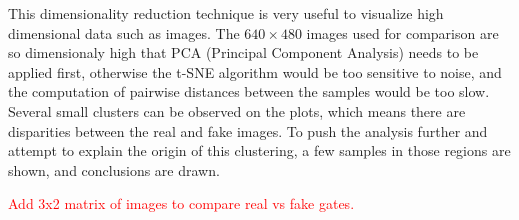 This dimensionality reduction technique is very useful to visualize high
dimensional data such as images. The $640 \times 480$ images used for
comparison are so dimensionaly high that PCA (Principal Component Analysis)
needs to be applied first, otherwise the t-SNE algorithm would be too sensitive
to noise, and the computation of pairwise distances between the samples would
be too slow.\\

Several small clusters can be observed on the plots, which means there are
disparities between the real and fake images. To push the analysis further and
attempt to explain the origin of this clustering, a few samples in those
regions are shown, and conclusions are drawn.

\textcolor{red}{Add 3x2 matrix of images to compare real vs fake gates.}


